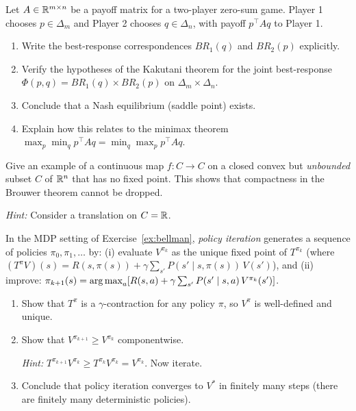 \documentclass[11pt,a4paper]{article}
\begin{document}
\begin{exercise}
\label{ex:kakutani-zerosum}
Let $A \in \mathbb{R}^{m \times n}$ be a payoff matrix for a two-player
zero-sum game.  Player 1 chooses $p \in \Delta_m$ and Player 2
chooses $q \in \Delta_n$, with payoff $p^\top A q$ to Player 1.
\begin{enumerate}[label=(\alph*)]
    \item Write the best-response correspondences $BR_1(q)$ and
          $BR_2(p)$ explicitly.
    \item Verify the hypotheses of the Kakutani theorem for the joint
          best-response
          $\Phi(p, q) = BR_1(q) \times BR_2(p)$ on
          $\Delta_m \times \Delta_n$.
    \item Conclude that a Nash equilibrium (saddle point) exists.
    \item Explain how this relates to the minimax theorem
          $\max_p \min_q p^\top A q = \min_q \max_p p^\top A q$.
\end{enumerate}
\end{exercise}

\begin{exercise}\label{ex:no-fp}
Give an example of a continuous map $f \colon C \to C$ on a closed
convex but \emph{unbounded} subset $C$ of $\mathbb{R}^n$ that has no fixed
point.  This shows that compactness in the Brouwer theorem cannot be
dropped.

\emph{Hint:} Consider a translation on $C = \mathbb{R}$.
\end{exercise}

\begin{exercise}\label{ex:policy-iter}
In the MDP setting of Exercise~\ref{ex:bellman}, \emph{policy
iteration} generates a sequence of policies $\pi_0, \pi_1, \ldots$ by:
(i) evaluate $V^{\pi_k}$ as the unique fixed point of $T^{\pi_k}$
(where $(T^\pi V)(s) = R(s, \pi(s)) + \gamma \sum_{s'} P(s' \mid s,
\pi(s))\, V(s')$), and (ii) improve:
$\pi_{k+1}(s) = \operatorname{arg\,max}_{a} [R(s,a) + \gamma \sum_{s'} P(s' \mid
s, a)\, V^{\pi_k}(s')]$.
\begin{enumerate}[label=(\alph*)]
    \item Show that $T^{\pi}$ is a $\gamma$-contraction for any
          policy $\pi$, so $V^{\pi}$ is well-defined and unique.
    \item Show that $V^{\pi_{k+1}} \geq V^{\pi_k}$ componentwise.

          \emph{Hint:}
          $T^{\pi_{k+1}} V^{\pi_k} \geq T^{\pi_k} V^{\pi_k}
          = V^{\pi_k}$.  Now iterate.
    \item Conclude that policy iteration converges to $V^*$ in
          finitely many steps (there are finitely many deterministic
          policies).
\end{enumerate}
\end{exercise}
\end{document}
